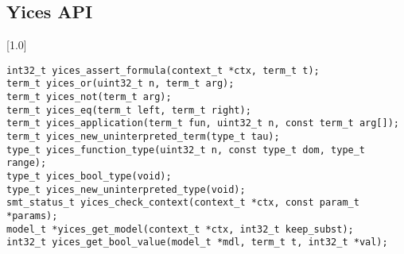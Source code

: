 \subsection{Yices API}
\begin{frame}
\scalebox{0.8}[1.0]{\begin{minipage}{40em}
		
		
		\texttt{{\colEm int32\_t} yices\_assert\_formula({\colEm context\_t *ctx}, {\colEm term\_t} t);}
		\\[0.75em]
		\texttt{{\colEm term\_t} yices\_or({\colEm uint32\_t} n, {\colEm term\_t} arg{\colEm []});}
		\\[0.25em]		
		\texttt{{\colEm term\_t} yices\_not({\colEm term\_t} arg);}
		\\[0.25em]
		\texttt{{\colEm term\_t} yices\_eq({\colEm term\_t} left, {\colEm term\_t} right);}
		\\[0.75em]
		\texttt{{\colEm term\_t} yices\_application({\colEm term\_t} fun, {\colEm uint32\_t} n, const {\colEm term\_t} arg[]);}
		\\[0.25em]
									\texttt{{\colEm term\_t} yices\_new\_uninterpreted\_term({\colEm type\_t} tau);}
									\\[0.75em]							
									\texttt{{\colEm type\_t} yices\_function\_type({\colEm uint32\_t} n, const {\colEm type\_t} dom{\colEm []}, {\colEm type\_t} range);}
									\\[0.25em]
\texttt{{\colEm type\_t} yices\_bool\_type({\colEm void});}
\\[0.25em]							
\texttt{{\colEm type\_t} yices\_new\_uninterpreted\_type({\colEm void});}
\\[0.75em]
\texttt{{\colEm smt\_status\_t} yices\_check\_context({\colEm context\_t *}ctx, const {\colEm param\_t *}params);}
\\[0.25em]
\texttt{{\colEm model\_t} *yices\_get\_model({\colEm context\_t *}ctx, {\colEm int32\_t} keep\_subst);}
\\[0.25em]
\texttt{{\colEm int32\_t} yices\_get\_bool\_value({\colEm model\_t *}mdl, {\colEm term\_t} t, {\colEm int32\_t *}val);}
\end{minipage}}
							
							
						
	
						\end{frame}